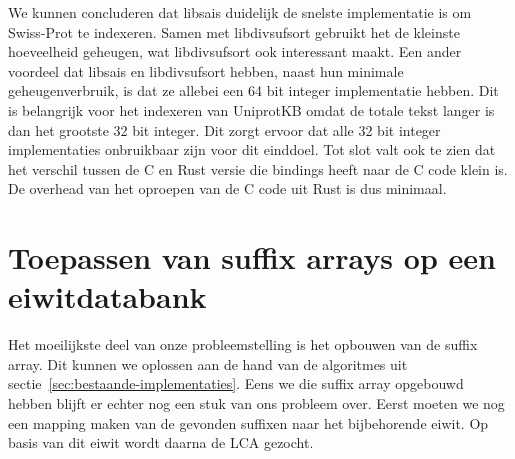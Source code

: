 We kunnen concluderen dat libsais duidelijk de snelste implementatie is om Swiss-Prot te indexeren.
Samen met libdivsufsort gebruikt het de kleinste hoeveelheid geheugen, wat libdivsufsort ook interessant maakt.
Een ander voordeel dat libsais en libdivsufsort hebben, naast hun minimale geheugenverbruik, is dat ze allebei een 64 bit integer implementatie hebben.
Dit is belangrijk voor het indexeren van UniprotKB omdat de totale tekst langer is dan het grootste 32 bit integer.
Dit zorgt ervoor dat alle 32 bit integer implementaties onbruikbaar zijn voor dit einddoel.
Tot slot valt ook te zien dat het verschil tussen de C en Rust versie die bindings heeft naar de C code klein is.
De overhead van het oproepen van de C code uit Rust is dus minimaal.

\section{Toepassen van suffix arrays op een eiwitdatabank}\label{sec:toepassen-van-suffix-arrays-op-een-eiwitdatabank}
Het moeilijkste deel van onze probleemstelling is het opbouwen van de suffix array.
Dit kunnen we oplossen aan de hand van de algoritmes uit sectie~\ref{sec:bestaande-implementaties}.
Eens we die suffix array opgebouwd hebben blijft er echter nog een stuk van ons probleem over.
Eerst moeten we nog een mapping maken van de gevonden suffixen naar het bijbehorende eiwit.
Op basis van dit eiwit wordt daarna de LCA gezocht.

